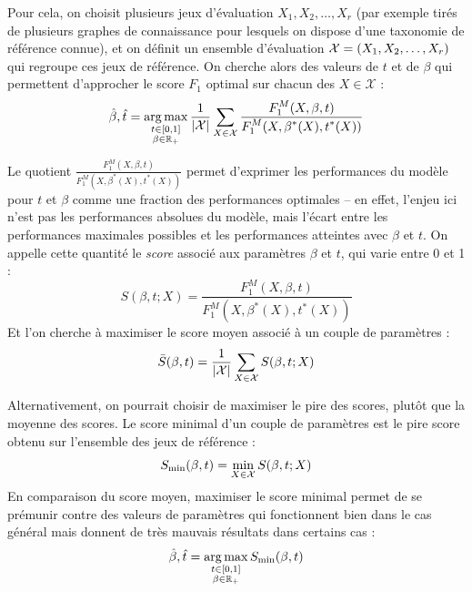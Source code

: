 Pour cela, on choisit plusieurs jeux d'évaluation $X_1, X_2, \ldots, X_r$ (par exemple tirés de plusieurs graphes de connaissance pour lesquels on dispose d'une taxonomie de référence connue), et on définit un ensemble d'évaluation $\cal{X} = (X_1, X_2, \ldots, X_r)$ qui regroupe ces jeux de référence. On cherche alors des valeurs de $t$ et de $\beta$ qui permettent d'approcher le score $F_1$ optimal sur chacun des $X \in \mathcal{X}$ :
\begin{equation}
    \hat{\beta}, \hat{t} = \argmax_{\substack{t \in [0, 1] \\ \beta \in \R_+}} \frac{1}{| \cal{X} |} \sum_{X \in \cal{X}} \frac{\displaystyle F_1^M(X, \beta, t)}{\displaystyle F_1^M(X, \beta^*(X), t^*(X))}
\end{equation}

Le quotient $\frac{ F_1^M(X, \beta, t)}{ F_1^M(X, \beta^*(X), t^*(X))}$ permet d'exprimer les performances du modèle pour $t$ et $\beta$ comme une fraction des performances optimales – en effet, l'enjeu ici n'est pas les performances absolues du modèle, mais l'écart entre les performances maximales possibles et les performances atteintes avec $\beta$ et $t$. On appelle cette quantité le \textit{score} associé aux paramètres $\beta$ et $t$, qui varie entre 0 et 1 :
\begin{equation}
    S(\beta, t; X) = \frac{\displaystyle F_1^M(X, \beta, t)}{\displaystyle F_1^M(X, \beta^*(X), t^*(X))}
\end{equation}
%
Et l'on cherche à maximiser le score moyen associé à un couple de paramètres :
\begin{equation}
    \bar{S}(\beta, t) = \frac{1}{| \cal{X} |} \sum_{X \in \cal{X}} S(\beta, t; X)
\end{equation}


Alternativement, on pourrait choisir de maximiser le pire des scores, plutôt que la moyenne des scores. Le score minimal d'un couple de paramètres est le pire score obtenu sur l'ensemble des jeux de référence :
\begin{equation}
    S_{\min}(\beta, t) = \min_{X \in \cal{X}} S(\beta, t; X)
\end{equation}
En comparaison du score moyen, maximiser le score minimal permet de se prémunir contre des valeurs de paramètres qui fonctionnent bien dans le cas général mais donnent de très mauvais résultats dans certains cas :
\begin{equation}
    \hat{\beta}, \hat{t} = \argmax_{\substack{t \in [0, 1] \\ \beta \in \R_+}}
    S_{\min}(\beta, t)
\end{equation}

